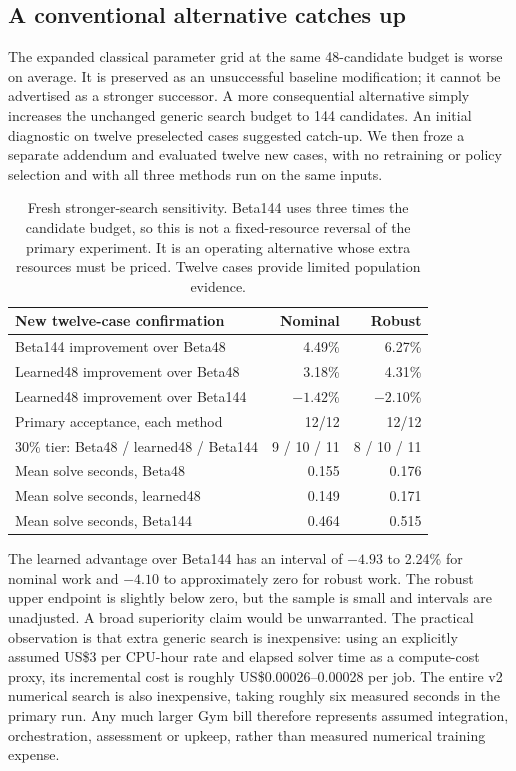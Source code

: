 \documentclass[11pt,letterpaper]{article}
\newcommand{\USD}{US\$}
\begin{document}
\subsection{A conventional alternative catches up}

The expanded classical parameter grid at the same 48-candidate budget is worse on average. It is preserved as an unsuccessful baseline modification; it cannot be advertised as a stronger successor. A more consequential alternative simply increases the unchanged generic search budget to 144 candidates. An initial diagnostic on twelve preselected cases suggested catch-up. We then froze a separate addendum and evaluated twelve new cases, with no retraining or policy selection and with all three methods run on the same inputs.

\begin{table}[htbp]
\centering\small
\begin{tabular}{lrr}
\toprule
New twelve-case confirmation & Nominal & Robust\\
\midrule
Beta144 improvement over Beta48 & 4.49\% & 6.27\%\\
Learned48 improvement over Beta48 & 3.18\% & 4.31\%\\
Learned48 improvement over Beta144 & $-1.42$\% & $-2.10$\%\\
Primary acceptance, each method & 12/12 & 12/12\\
30\% tier: Beta48 / learned48 / Beta144 & 9 / 10 / 11 & 8 / 10 / 11\\
Mean solve seconds, Beta48 & 0.155 & 0.176\\
Mean solve seconds, learned48 & 0.149 & 0.171\\
Mean solve seconds, Beta144 & 0.464 & 0.515\\
\bottomrule
\end{tabular}
\caption{Fresh stronger-search sensitivity. Beta144 uses three times the candidate budget, so this is not a fixed-resource reversal of the primary experiment. It is an operating alternative whose extra resources must be priced. Twelve cases provide limited population evidence.}
\label{tab:catchup}
\end{table}

The learned advantage over Beta144 has an interval of $-4.93$ to 2.24\% for nominal work and $-4.10$ to approximately zero for robust work. The robust upper endpoint is slightly below zero, but the sample is small and intervals are unadjusted. A broad superiority claim would be unwarranted. The practical observation is that extra generic search is inexpensive: using an explicitly assumed \USD3 per CPU-hour rate and elapsed solver time as a compute-cost proxy, its incremental cost is roughly \USD0.00026--0.00028 per job. The entire v2 numerical search is also inexpensive, taking roughly six measured seconds in the primary run. Any much larger Gym bill therefore represents assumed integration, orchestration, assessment or upkeep, rather than measured numerical training expense.
\end{document}
